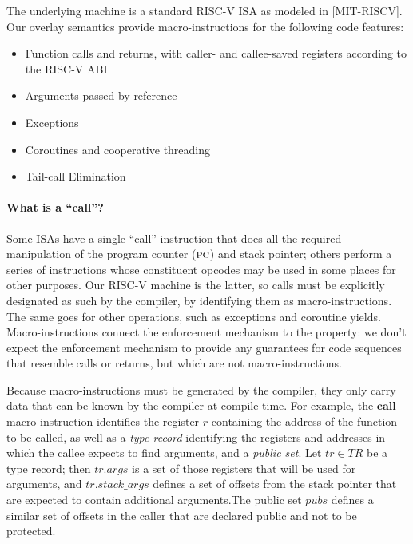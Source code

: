 \documentclass[10pt,conference]{ieeetran}%
\theoremstyle{definition}
\begin{document}
The underlying machine is a standard RISC-V ISA as modeled in [MIT-RISCV].
Our overlay semantics provide macro-instructions for the following code features:
\begin{itemize}
\item Function calls and returns, with caller- and callee-saved registers according
  to the RISC-V ABI
\item Arguments passed by reference
\item Exceptions
\item Coroutines and cooperative threading
\item Tail-call Elimination
\end{itemize}

\paragraph*{What is a ``call''?} Some ISAs have a single ``call''
instruction that does all the required manipulation of the program counter
(\(\textsc{pc}\)) and stack pointer; others perform a series of instructions
whose constituent opcodes may be used in some places for other purposes.
Our RISC-V machine is the latter, so calls must be explicitly designated
as such by the compiler, by identifying them as macro-instructions.
The same goes for other operations, such as exceptions and coroutine yields.
Macro-instructions connect the enforcement mechanism to the property: we don't
expect the enforcement mechanism to provide any guarantees for code sequences
that resemble calls or returns, but which are not macro-instructions.

Because macro-instructions must be generated by the compiler, they only
carry data that can be known by the compiler at compile-time. For example,
the \(\mathbf{call}\) macro-instruction identifies the register \(r\) containing
the address of the function to be called, as well as a {\it type record} identifying
the registers and addresses in which the callee expects to find arguments,
and a {\it public set}.
Let \(tr \in TR\) be a type record; then \(tr.args\) is a set of those registers
that will be used for arguments, and \(tr.stack\_args\) defines a set of
offsets from the stack pointer that are expected to contain additional
arguments.The public set \(pubs\) defines a similar set of offsets in
the caller that are declared public and not to be protected.

\end{document}
